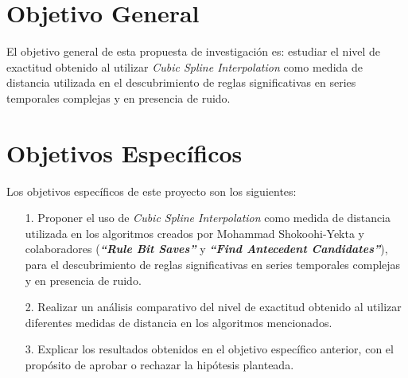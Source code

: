 \section{\textbf{Objetivo General}}
El objetivo general de esta propuesta de investigaci\'on es: estudiar el nivel de exactitud obtenido al utilizar \textit{Cubic Spline Interpolation} como medida de distancia utilizada en el descubrimiento de reglas significativas en series temporales complejas y en presencia de ruido.
\section{\textbf{Objetivos Espec\'ificos}}
Los objetivos espec\'ificos de este proyecto son los siguientes:
\begin{itemize}
\item [1.] Proponer el uso de \textit{Cubic Spline Interpolation} como medida de distancia utilizada en los algoritmos creados por Mohammad Shokoohi-Yekta y colaboradores (\textit{\textbf{\enquote{Rule Bit Saves}}} y \textit{\textbf{\enquote{Find Antecedent Candidates}}}), para el descubrimiento de reglas significativas en series temporales complejas y en presencia de ruido.
	\item [2.] Realizar un an\'alisis comparativo del nivel de exactitud obtenido al utilizar diferentes medidas de distancia en los algoritmos mencionados.
\item [3.] Explicar los resultados obtenidos en el objetivo espec\'ifico anterior, con el prop\'osito de aprobar o rechazar la hip\'otesis planteada.
\end{itemize}